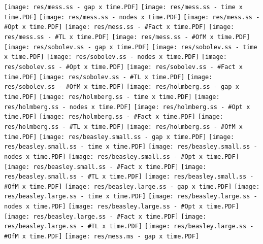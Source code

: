 	\texttt{[image: res/mess.ss - gap x time.PDF]} 
	\texttt{[image: res/mess.ss - time x time.PDF]} 
	\texttt{[image: res/mess.ss - nodes x time.PDF]} 
	\texttt{[image: res/mess.ss - \#Opt x time.PDF]} 
	\texttt{[image: res/mess.ss - \#Fact x time.PDF]} 
	\texttt{[image: res/mess.ss - \#TL x time.PDF]} 
	\texttt{[image: res/mess.ss - \#OfM x time.PDF]} 
	\texttt{[image: res/sobolev.ss - gap x time.PDF]} 
	\texttt{[image: res/sobolev.ss - time x time.PDF]} 
	\texttt{[image: res/sobolev.ss - nodes x time.PDF]} 
	\texttt{[image: res/sobolev.ss - \#Opt x time.PDF]} 
	\texttt{[image: res/sobolev.ss - \#Fact x time.PDF]} 
	\texttt{[image: res/sobolev.ss - \#TL x time.PDF]} 
	\texttt{[image: res/sobolev.ss - \#OfM x time.PDF]} 
	\texttt{[image: res/holmberg.ss - gap x time.PDF]} 
	\texttt{[image: res/holmberg.ss - time x time.PDF]} 
	\texttt{[image: res/holmberg.ss - nodes x time.PDF]} 
	\texttt{[image: res/holmberg.ss - \#Opt x time.PDF]} 
	\texttt{[image: res/holmberg.ss - \#Fact x time.PDF]} 
	\texttt{[image: res/holmberg.ss - \#TL x time.PDF]} 
	\texttt{[image: res/holmberg.ss - \#OfM x time.PDF]} 
	\texttt{[image: res/beasley.small.ss - gap x time.PDF]} 
	\texttt{[image: res/beasley.small.ss - time x time.PDF]} 
	\texttt{[image: res/beasley.small.ss - nodes x time.PDF]} 
	\texttt{[image: res/beasley.small.ss - \#Opt x time.PDF]} 
	\texttt{[image: res/beasley.small.ss - \#Fact x time.PDF]} 
	\texttt{[image: res/beasley.small.ss - \#TL x time.PDF]} 
	\texttt{[image: res/beasley.small.ss - \#OfM x time.PDF]} 
	\texttt{[image: res/beasley.large.ss - gap x time.PDF]} 
	\texttt{[image: res/beasley.large.ss - time x time.PDF]} 
	\texttt{[image: res/beasley.large.ss - nodes x time.PDF]} 
	\texttt{[image: res/beasley.large.ss - \#Opt x time.PDF]} 
	\texttt{[image: res/beasley.large.ss - \#Fact x time.PDF]} 
	\texttt{[image: res/beasley.large.ss - \#TL x time.PDF]} 
	\texttt{[image: res/beasley.large.ss - \#OfM x time.PDF]} 
	\texttt{[image: res/mess.ms - gap x time.PDF]} 
